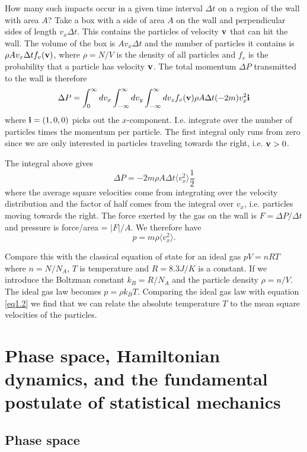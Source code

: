 \documentclass{article}
\begin{document}
How many such impacts occur in a given time interval $\Delta t$ on a region of the wall with area $A$? 
Take a box with a side of area $A$ on the wall and perpendicular sides of length $v_x\Delta t$. This contains the particles of velocity ${\bf v}$ that can hit the wall. The volume of the box is $Av_x\Delta t$ and the number of particles it contains is $\rho Av_x\Delta t f_v({\bf v})$, where $\rho=N/V$ is the density of all particles  and $f_v$ is the probability that a particle has velocity $\bf v$.
The total momentum $\Delta P$ transmitted to the wall is therefore
$$\Delta P =\int_0^\infty dv_x \int_{-\infty}^\infty dv_y \int_{-\infty}^\infty dv_z f_v({\bf v})\rho A\Delta t(-2m)v_x^2{\bf i}$$
where ${\bf i} =(1,0,0)$ picks out the $x$-component. I.e. integrate over the number of particles times the momentum per particle. The first integral only runs from zero since we are only interested in particles traveling towards the right, i.e. ${\bf v}>0$.

The integral above gives 
$$\Delta P = -2m\rho A\Delta t \langle v_x^2\rangle\frac12$$ where the average square velocities come from integrating over the velocity distribution and the factor of half comes from the integral over $v_x$, i.e. particles moving towards the right.
The force exerted by the gas on the wall is $F=\Delta P/\Delta t$ and pressure is force/area = $|F|/A$.
We therefore have 
\begin{equation}
	p=m\rho  \langle v_x^2\rangle.
	\label{eq1.2}
\end{equation}
 
Compare this with the classical equation of state for an ideal gas $pV=nRT$ where $n=N/N_A$, $T$ is temperature and $R=8.3 J/K$ is a constant. If we introduce the Boltzman constant $k_B = R/N_A$ and the particle density $\rho =n/V$. The ideal gas law becomes $p=\rho k_BT$. Comparing the ideal gas law with equation \ref{eq1.2} 
we find that we can relate the absolute temperature $T$ to the mean square velocities of the particles.

\section*{Phase space, Hamiltonian dynamics, and the fundamental postulate of statistical mechanics}


\subsection*{Phase space}
\end{document}
